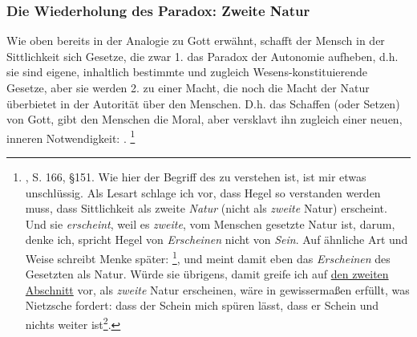 \documentclass[12pt, a4paper, openany]{report}
\begin{document}
\subsubsection{Die Wiederholung des Paradox: Zweite Natur}
Wie oben bereits in der Analogie zu Gott erwähnt, schafft der Mensch in der Sittlichkeit sich Gesetze, die zwar 1. das Paradox der Autonomie aufheben, d.h. sie sind eigene, inhaltlich bestimmte und zugleich Wesens-konstituierende Gesetze, aber sie werden 2. zu einer Macht, die noch die Macht der Natur überbietet in der Autorität über den Menschen.
D.h. das Schaffen (oder Setzen) von Gott, gibt den Menschen die Moral, aber versklavt ihn zugleich einer neuen, inneren Notwendigkeit: .%
\footnote{\cite{hegel_grundlinien_2017}, S. 166, §151.
    Wie hier der Begriff des  zu verstehen ist, ist mir etwas unschlüssig. 
    Als Lesart schlage ich vor, dass Hegel so verstanden werden muss, dass Sittlichkeit als zweite \emph{Natur} (nicht als \emph{zweite} Natur) erscheint. 
    Und sie \emph{erscheint}, weil es \emph{zweite}, vom Menschen gesetzte Natur ist, darum, denke ich, spricht Hegel von \emph{Erscheinen} nicht von \emph{Sein}.
    Auf ähnliche Art und Weise schreibt Menke später: \footcite[][142]{menke_autonomie_2018}, und meint damit eben das \emph{Erscheinen} des Gesetzten als Natur.
    Würde sie übrigens, damit greife ich auf \hyperref[abschnitt_2]{den zweiten Abschnitt} vor, als \emph{zweite} Natur erscheinen, wäre in gewissermaßen erfüllt, was Nietzsche fordert: 
    dass der Schein mich spüren lässt, dass er Schein und nichts weiter ist\footcite[Vlg.][§54, S.416.]{nietzsche_morgenrote_1999}.}
\end{document}
